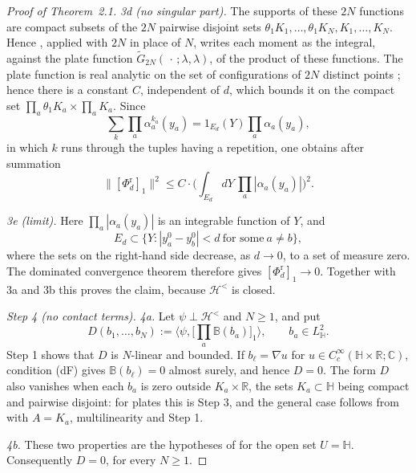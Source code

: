 \documentclass[11pt,letterpaper,reqno]{amsart}
\theoremstyle{definition}
\begin{document}
\begin{proof}[Proof of Theorem~2.1]
\emph{3d (no singular part).} The supports of these $2N$ functions are compact subsets of the $2N$ pairwise disjoint sets $\theta_1K_1,\dots,\theta_1K_N,K_1,\dots,K_N$.
Hence \cite[Section~8.10, equation~(8.42)]{QEDConstruction}, applied with $2N$ in place of $N$, writes each moment as the integral, against the plate function $\tilde G_{2N}(\,\cdot\,;\lambda,\lambda)$, of the product of these functions.
The plate function is real analytic on the set of configurations of $2N$ distinct points \cite[Section~8.10, equation~(8.42)]{QEDConstruction}; hence there is a constant $C$, independent of $d$, which bounds it on the compact set $\prod_a\theta_1K_a\times\prod_aK_a$.
Since
\begin{equation*}
\sum_k\prod_a\alpha_a^{k_a}(y_a)=1_{E_d}(Y)\prod_a\alpha_a(y_a),
\end{equation*}
in which $k$ runs through the tuples having a repetition, one obtains after summation
\begin{equation*}
\|[\Phi^{\mathrm r}_d]_1\|^2\le C\cdot\Big(\int_{E_d}dY\,\prod_a|\alpha_a(y_a)|\Big)^2.
\end{equation*}

\emph{3e (limit).} Here $\prod_a|\alpha_a(y_a)|$ is an integrable function of $Y$, and
\begin{equation*}
E_d\subset\{Y:|y_a^0-y_b^0|<d\ \text{for some}\ a\ne b\},
\end{equation*}
where the sets on the right-hand side decrease, as $d\to0$, to a set of measure zero.
The dominated convergence theorem therefore gives $[\Phi^{\mathrm r}_d]_1\to0$.
Together with 3a and 3b this proves the claim, because $\mathcal H^{<}$ is closed.

\emph{Step 4 (no contact terms).}
\emph{4a.} Let $\psi\perp\mathcal H^{<}$ and $N\ge1$, and put
\begin{equation*}
D(b_1,\dots,b_N):=\Big\langle\psi,\Big[\prod_a\mathbb B(b_a)\Big]_1\Big\rangle,\qquad b_a\in L^2_{\mathbb H}.
\end{equation*}
Step 1 shows that $D$ is $N$-linear and bounded.
If $b_\ell=\nabla u$ for $u\in C_c^\infty(\mathbb H\times\mathbb R;\mathbb C)$, condition (dF) gives $\mathbb B(b_\ell)=0$ almost surely, and hence $D=0$.
The form $D$ also vanishes when each $b_a$ is zero outside $K_a\times\mathbb R$, the sets $K_a\subset\mathbb H$ being compact and pairwise disjoint: for plates this is Step 3, and the general case follows from \cite[Section~8.2]{QEDConstruction} with $A=K_a$, multilinearity and Step 1.

\emph{4b.} These two properties are the hypotheses of \cite[Proposition~8.4]{QEDConstruction} for the open set $U=\mathbb H$.
Consequently $D=0$, for every $N\ge1$.


\end{proof}
\end{document}
